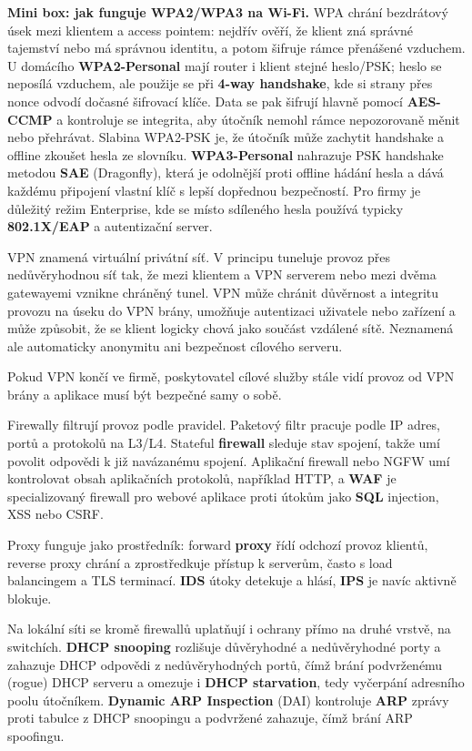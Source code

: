 \documentclass[11pt,a4paper]{article}
\newcommand{\itpr}[1]{\medskip\noindent\colorbox{green!8}{\parbox{\dimexpr\linewidth-2\fboxsep}{#1}}\medskip}
\begin{document}
\itpr{\textbf{Mini box: jak funguje WPA2/WPA3 na Wi-Fi.} WPA chrání bezdrátový úsek mezi klientem a access pointem: nejdřív ověří, že klient zná správné tajemství nebo má správnou identitu, a potom šifruje rámce přenášené vzduchem. U domácího \textbf{WPA2-Personal} mají router i klient stejné heslo/PSK; heslo se neposílá vzduchem, ale použije se při \textbf{4-way handshake}, kde si strany přes nonce odvodí dočasné šifrovací klíče. Data se pak šifrují hlavně pomocí \textbf{AES-CCMP} a kontroluje se integrita, aby útočník nemohl rámce nepozorovaně měnit nebo přehrávat. Slabina WPA2-PSK je, že útočník může zachytit handshake a offline zkoušet hesla ze slovníku. \textbf{WPA3-Personal} nahrazuje PSK handshake metodou \textbf{SAE} (Dragonfly), která je odolnější proti offline hádání hesla a dává každému připojení vlastní klíč s lepší dopřednou bezpečností. Pro firmy je důležitý režim Enterprise, kde se místo sdíleného hesla používá typicky \textbf{802.1X/EAP} a autentizační server.}

VPN znamená virtuální privátní síť. V principu tuneluje provoz přes nedůvěryhodnou síť tak, že mezi klientem a VPN serverem nebo mezi dvěma gatewayemi vznikne chráněný tunel. VPN může chránit důvěrnost a integritu provozu na úseku do VPN brány, umožňuje autentizaci uživatele nebo zařízení a může způsobit, že se klient logicky chová jako součást vzdálené sítě. Neznamená ale automaticky anonymitu ani bezpečnost cílového serveru.

Pokud VPN končí ve firmě, poskytovatel cílové služby stále vidí provoz od VPN brány a aplikace musí být bezpečné samy o sobě.

Firewally filtrují provoz podle pravidel. Paketový filtr pracuje podle IP adres, portů a protokolů na L3/L4. Stateful \textbf{firewall} sleduje stav spojení, takže umí povolit odpovědi k již navázanému spojení. Aplikační firewall nebo NGFW umí kontrolovat obsah aplikačních protokolů, například HTTP, a \textbf{WAF} je specializovaný firewall pro webové aplikace proti útokům jako \textbf{SQL} injection, XSS nebo CSRF.

Proxy funguje jako prostředník: forward \textbf{proxy} řídí odchozí provoz klientů, reverse proxy chrání a zprostředkuje přístup k serverům, často s load balancingem a TLS terminací. \textbf{IDS} útoky detekuje a hlásí, \textbf{IPS} je navíc aktivně blokuje.

Na lokální síti se kromě firewallů uplatňují i ochrany přímo na druhé vrstvě, na switchích. \textbf{DHCP snooping} rozlišuje důvěryhodné a nedůvěryhodné porty a zahazuje DHCP odpovědi z nedůvěryhodných portů, čímž brání podvrženému (rogue) DHCP serveru a omezuje i \textbf{DHCP starvation}, tedy vyčerpání adresního poolu útočníkem. \textbf{Dynamic ARP Inspection} (DAI) kontroluje \textbf{ARP} zprávy proti tabulce z DHCP snoopingu a podvržené zahazuje, čímž brání ARP spoofingu.
\end{document}
